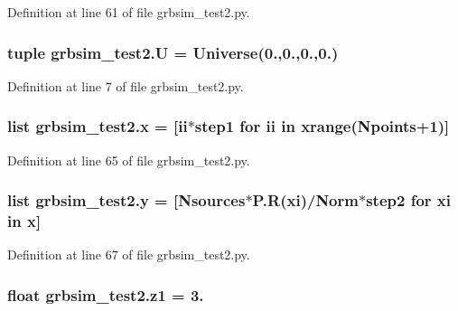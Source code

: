 Definition at line 61 of file grbsim\-\_\-test2.\-py.

\hypertarget{namespacegrbsim__test2_a833750999f6a6a533fa1953401f6f558}{
\subsubsection[{U}]{\setlength{\rightskip}{0pt plus 5cm}tuple grbsim\-\_\-test2.\-U = {\bf Universe}(0.,0.,0.,0.)}}\label{namespacegrbsim__test2_a833750999f6a6a533fa1953401f6f558}


Definition at line 7 of file grbsim\-\_\-test2.\-py.

\hypertarget{namespacegrbsim__test2_af3ce9539dbd66711a210223e0c4fe6ba}{
\subsubsection[{x}]{\setlength{\rightskip}{0pt plus 5cm}list grbsim\-\_\-test2.\-x = \mbox{[}ii$\ast${\bf step1} for ii in xrange({\bf Npoints}+1)\mbox{]}}}\label{namespacegrbsim__test2_af3ce9539dbd66711a210223e0c4fe6ba}


Definition at line 65 of file grbsim\-\_\-test2.\-py.

\hypertarget{namespacegrbsim__test2_aa5930b6868e7cac458e6d1289e0dc7af}{
\subsubsection[{y}]{\setlength{\rightskip}{0pt plus 5cm}list grbsim\-\_\-test2.\-y = \mbox{[}{\bf Nsources}$\ast$P.\-R(xi)/{\bf Norm}$\ast${\bf step2} for xi in {\bf x}\mbox{]}}}\label{namespacegrbsim__test2_aa5930b6868e7cac458e6d1289e0dc7af}


Definition at line 67 of file grbsim\-\_\-test2.\-py.

\hypertarget{namespacegrbsim__test2_aeb09b32704568d287377dcfa0a67db3c}{
\subsubsection[{z1}]{\setlength{\rightskip}{0pt plus 5cm}float grbsim\-\_\-test2.\-z1 = 3.}}\label{namespacegrbsim__test2_aeb09b32704568d287377dcfa0a67db3c}


